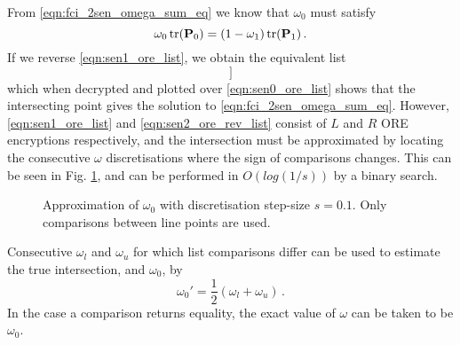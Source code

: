\documentclass[letterpaper, 10 pt, conference]{ieeeconf}  %
\begin{document}
From \eqref{eqn:fci_2sen_omega_sum_eq} we know that $\omega_0$ must satisfy
\begin{equation}
   \omega_0 \operatorname{tr}({{\mathbf{P}}}_0) = (1-\omega_1)\operatorname{tr}({{\mathbf{P}}}_1)\,. \label{eqn:secfci_2sen_intersect}
\end{equation}
If we reverse \eqref{eqn:sen1_ore_list}, we obtain the equivalent list
\begin{equation}
   [\mathcal{E}^R_{ORE}((1-\omega)\tr(\mP_1)),\ \omega \in [0,0+s,\dots,1-s,1]] \label{eqn:sen2_ore_rev_list}
\end{equation}
which when decrypted and plotted over \eqref{eqn:sen0_ore_list} shows that the intersecting point gives the solution to \eqref{eqn:fci_2sen_omega_sum_eq}. However, \eqref{eqn:sen1_ore_list} and \eqref{eqn:sen2_ore_rev_list} consist of $L$ and $R$ ORE encryptions respectively, and the intersection must be approximated by locating the consecutive $\omega$ discretisations where the sign of comparisons changes. This can be seen in Fig. \ref{fig:2_sensor_sol}, and can be performed in $O(log(1/s))$ by a binary search.
\begin{figure}[tb]
   \vspace{-5pt}
   \begin{center}
      
   \end{center}
   \vspace{-10pt}
   \caption{Approximation of $\omega_0$ with discretisation step-size $s=0.1$. Only comparisons between line points are used.}
   \label{fig:2_sensor_sol}
\end{figure}
Consecutive $\omega_l$ and $\omega_u$ for which list comparisons differ can be used to estimate the true intersection, and $\omega_0$, by
\begin{equation}
   \omega_0'=\frac{1}{2}(\omega_l + \omega_u)\,. \label{eqn:secfci_2sen_omega}
\end{equation}
In the case a comparison returns equality, the exact value of $\omega$ can be taken to be $\omega_0$.

\end{document}
